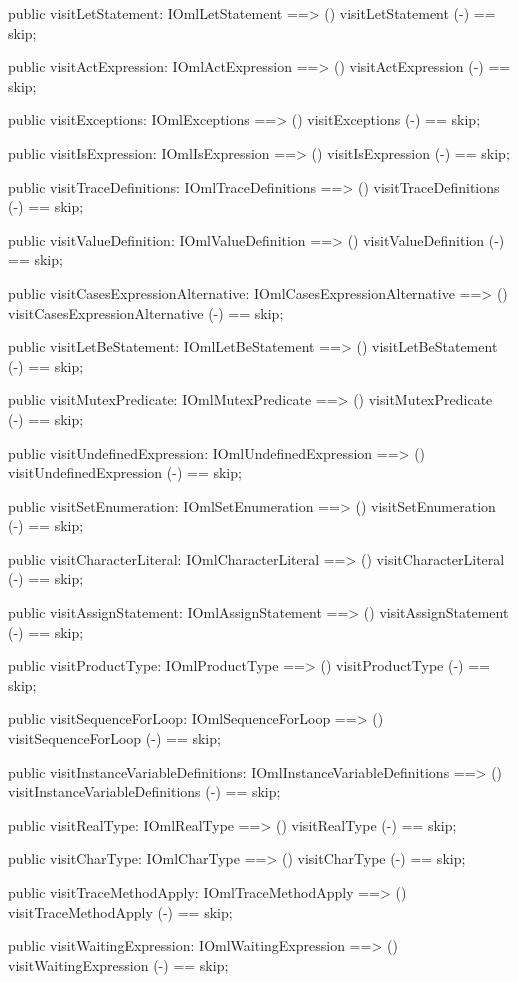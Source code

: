 \begin{vdm_al}
  public visitLetStatement: IOmlLetStatement ==> ()
  visitLetStatement (-) == skip;

  public visitActExpression: IOmlActExpression ==> ()
  visitActExpression (-) == skip;

  public visitExceptions: IOmlExceptions ==> ()
  visitExceptions (-) == skip;

  public visitIsExpression: IOmlIsExpression ==> ()
  visitIsExpression (-) == skip;

  public visitTraceDefinitions: IOmlTraceDefinitions ==> ()
  visitTraceDefinitions (-) == skip;

  public visitValueDefinition: IOmlValueDefinition ==> ()
  visitValueDefinition (-) == skip;

  public visitCasesExpressionAlternative: IOmlCasesExpressionAlternative ==> ()
  visitCasesExpressionAlternative (-) == skip;

  public visitLetBeStatement: IOmlLetBeStatement ==> ()
  visitLetBeStatement (-) == skip;

  public visitMutexPredicate: IOmlMutexPredicate ==> ()
  visitMutexPredicate (-) == skip;

  public visitUndefinedExpression: IOmlUndefinedExpression ==> ()
  visitUndefinedExpression (-) == skip;

  public visitSetEnumeration: IOmlSetEnumeration ==> ()
  visitSetEnumeration (-) == skip;

  public visitCharacterLiteral: IOmlCharacterLiteral ==> ()
  visitCharacterLiteral (-) == skip;

  public visitAssignStatement: IOmlAssignStatement ==> ()
  visitAssignStatement (-) == skip;

  public visitProductType: IOmlProductType ==> ()
  visitProductType (-) == skip;

  public visitSequenceForLoop: IOmlSequenceForLoop ==> ()
  visitSequenceForLoop (-) == skip;

  public visitInstanceVariableDefinitions: IOmlInstanceVariableDefinitions ==> ()
  visitInstanceVariableDefinitions (-) == skip;

  public visitRealType: IOmlRealType ==> ()
  visitRealType (-) == skip;

  public visitCharType: IOmlCharType ==> ()
  visitCharType (-) == skip;

  public visitTraceMethodApply: IOmlTraceMethodApply ==> ()
  visitTraceMethodApply (-) == skip;

  public visitWaitingExpression: IOmlWaitingExpression ==> ()
  visitWaitingExpression (-) == skip;


\end{vdm_al}
